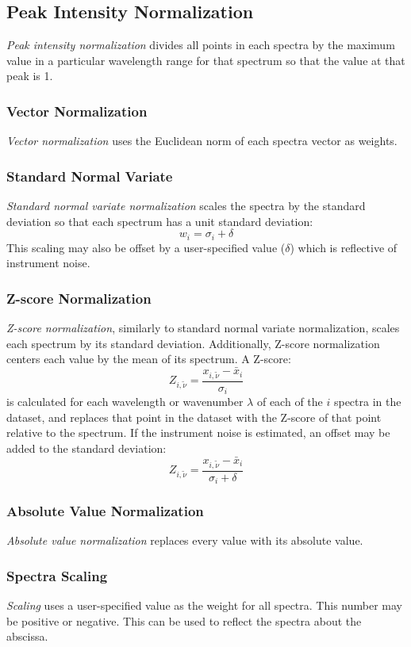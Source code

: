 \documentclass[12pt]{achemso} %
\begin{document}
\subsection{Peak Intensity Normalization} 
\emph{Peak intensity normalization} divides all points in each spectra by
the maximum value in a particular wavelength range for that spectrum so that the value
at that peak is 1.

\subsubsection{Vector Normalization} 
\emph{Vector normalization} uses the Euclidean norm of each spectra vector as weights.

\subsubsection{Standard Normal Variate} 
\emph{Standard normal variate normalization} scales the spectra by the standard
deviation so that each spectrum has a unit standard deviation:
\[w_i = \sigma_{i} + \delta\]
This scaling may also be offset by a user-specified value (\(\delta\)) which is reflective of instrument noise.

\subsubsection{Z-score Normalization}
\emph{Z-score normalization}, similarly to standard normal variate normalization, scales
each spectrum by its standard deviation. Additionally, Z-score normalization centers
each value by the mean of its spectrum. A Z-score: 
\[Z_{i, \tilde{\nu}} = \frac{x_{i, \tilde{\nu}} - \bar{x}_{i}}{\sigma_{i}}\] 
is calculated for each wavelength or wavenumber \(\lambda\) of each of the \(i\) spectra 
in the dataset, and replaces that point in the dataset with the Z-score of that 
point relative to the spectrum. If the
instrument noise is estimated, an offset may be added to the standard deviation:
\[Z_{i, \tilde{\nu}} = \frac{x_{i, \tilde{\nu}} - \bar{x}_{i}}{\sigma_{i}+\delta}\]

\subsubsection{Absolute Value Normalization}
\emph{Absolute value normalization} replaces every value with its absolute value.

\subsubsection{Spectra Scaling}
\emph{Scaling} uses a user-specified value as the weight for all spectra. This number
 may be positive or negative. This can be used to reflect the spectra about the abscissa.
\end{document}
